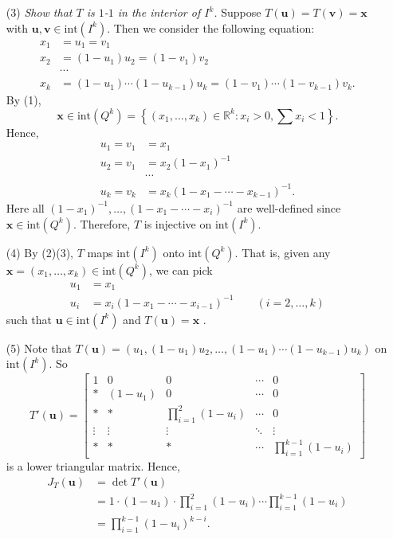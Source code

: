 \documentclass{article}
\begin{document}
\begin{enumerate}
\item[(3)]
  \emph{Show that $T$ is $1$-$1$ in the interior of $I^k$.}
  Suppose $T(\mathbf{u}) = T(\mathbf{v}) = \mathbf{x}$ with
  $\mathbf{u}, \mathbf{v} \in \mathrm{int}(I^k)$.
  Then we consider the following equation:
  \begin{align*}
    x_1 &= u_1 = v_1 \\
    x_2 &= (1-u_1)u_2 = (1-v_1)v_2 \\
    &\cdots \\
    x_k &= (1-u_1) \cdots (1-u_{k-1})u_k = (1-v_1) \cdots (1-v_{k-1})v_k.
  \end{align*}
  By (1),
  \[
    \mathbf{x} \in \mathrm{int}(Q^k)
    = \left\{ (x_1,\ldots,x_k) \in \mathbb{R}^k : x_i > 0, \sum x_i < 1 \right\}.
  \]
  Hence,
  \begin{align*}
    u_1 = v_1 &= x_1 \\
    u_2 = v_1 &= x_2(1-x_1)^{-1} \\
    &\cdots \\
    u_k = v_k &= x_k(1-x_1-\cdots-x_{k-1})^{-1}.
  \end{align*}
  Here all $(1-x_1)^{-1}, \ldots, (1-x_1-\cdots-x_{i})^{-1}$
  are well-defined since $\mathbf{x} \in \mathrm{int}(Q^k)$.
  Therefore, $T$ is injective on $\mathrm{int}(I^k)$.

\item[(4)]
  By (2)(3), $T$ maps $\mathrm{int}(I^k)$ onto $\mathrm{int}(Q^k)$.
  That is, given any $\mathbf{x} = (x_1,\ldots,x_k) \in \mathrm{int}(Q^k)$,
  we can pick
  \begin{align*}
    u_1 &= x_1 \\
    u_i &= x_i(1 - x_1 - \cdots - x_{i-1})^{-1}
    \qquad
    (i = 2, \ldots, k)
  \end{align*}
  such that $\mathbf{u} \in \mathrm{int}(I^k)$ and $T(\mathbf{u}) = \mathbf{x}$ .

\item[(5)]
  Note that
  $T(\mathbf{u}) = (u_1, (1-u_1)u_2, \ldots, (1-u_1)\cdots(1-u_{k-1})u_{k})$
  on $\mathrm{int}(I^k)$.
  So
  \[
    T'(\mathbf{u})
    =
    \begin{bmatrix}
      1      & 0       & 0                      & \cdots & 0 \\
      *      & (1-u_1) & 0                      & \cdots & 0 \\
      *      & *       & \prod_{i=1}^{2}(1-u_i) & \cdots & 0 \\
      \vdots &  \vdots & \vdots                 & \ddots & \vdots \\
      *      & *       & *                      & \cdots & \prod_{i=1}^{k-1}(1-u_i)
    \end{bmatrix}
  \]
  is a lower triangular matrix.
  Hence,
  \begin{align*}
    J_T(\mathbf{u})
    &= \det T'(\mathbf{u}) \\
    &= 1 \cdot (1-u_1) \cdot \prod_{i=1}^{2}(1-u_i) \cdots \prod_{i=1}^{k-1}(1-u_i) \\
    &= \prod_{i=1}^{k-1}(1-u_i)^{k-i}.
  \end{align*}


\end{enumerate}
\end{document}
